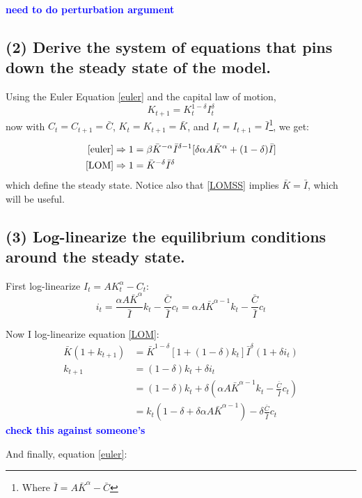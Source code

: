 \documentclass[]{article}
\newcommand{\fix} [1] {\textbf{\textcolor{blue}{#1}}} %
\begin{document}
\fix{need to do perturbation argument} 


\subsection*{(2) Derive the system of equations that pins down the steady state of the model.}

Using the Euler Equation \eqref{euler} and the capital law of motion, 
\begin{equation} \label{LOM}
K_{t+1}=K_{t}^{1-\delta}I_t^\delta 
\end{equation}
now with $C_t = C_{t+1} = \bar{C}$, $K_t=K_{t+1} = \bar{K}$, and $I_t = I_{t+1} = \bar{I}$\footnote{Where $\bar{I} = A\bar{K}^\alpha -\bar{C}$}, we get:

\begin{align}
\eqref{euler} & \Rightarrow 1 = \beta \bar{K}^{-\alpha}\bar{I}^{\delta-1}[\delta\alpha A \bar{K}^\alpha + (1-\delta)\bar{I} ]
\label {eulerSS}\\
\eqref{LOM} & \Rightarrow 1 = \bar{K}^{-\delta}\bar{I}^\delta \label{LOMSS}
\end{align}
which define the steady state. Notice also that \eqref{LOMSS} implies $\bar{K} = \bar{I}$, which will be useful. 


\subsection*{(3) Log-linearize the equilibrium conditions around the steady state.} 
First log-linearize $I_t = AK_t^\alpha -C_t$:
\[i_t = \frac{\alpha A\bar{K}^\alpha}{\bar{I}}k_t -\frac{\bar{C}}{\bar{I}}c_t
= \alpha A\bar{K}^{\alpha-1}k_t -\frac{\bar{C}}{\bar{I}}c_t\]

Now I log-linearize equation \eqref{LOM}:
\begin{align*}
\bar{K}(1+k_{t+1}) & = \bar{K}^{1-\delta}[1+(1-\delta)k_t]\bar{I}^\delta (1+\delta i_t)
\\
k_{t+1} & = (1-\delta)k_t+\delta i_t 
\\
& = (1-\delta)k_t+\delta \left(\alpha A\bar{K}^{\alpha-1}k_t -\frac{\bar{C}}{\bar{I}}c_t\right)
\\
& = k_t\left(1-\delta +\delta\alpha A\bar{K}^{\alpha-1}\right) -\delta\frac{\bar{C}}{\bar{I}}c_t
\end{align*} 
\fix{check this against someone's}

And finally, equation \eqref{euler}:
\end{document}
